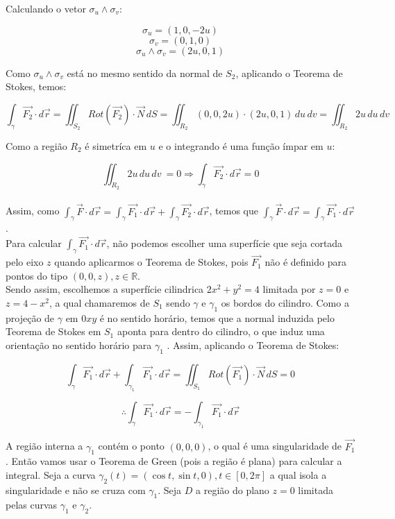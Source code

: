 \documentclass[12pt,a4paper]{article}
\begin{document}
Calculando o vetor $\sigma_{u} \wedge \sigma_{v}$:

\[ \sigma_u = (1,0, -2u ) \]
\[ \sigma_v = (0,1, 0 ) \]
\[  \sigma_u \wedge \sigma_v = ( 2u, 0, 1 ) \] 

Como $\sigma_u \wedge \sigma_v$ está no mesmo sentido da normal de $S_2$, aplicando o Teorema de Stokes, temos:

\[ \int_{\gamma} \vec{F_2} \cdot d\vec{r} = \iint_{S_2} Rot(\vec{F_2}) \cdot \vec{N} \,dS = \iint_{R_2} (0, 0, 2u) \cdot ( 2u, 0, 1 )  \,du \,dv =  \iint_{R_2} 2u \,du \,dv\]

Como a região $R_2$ é simetríca em $u$ e o integrando é uma função ímpar em $u$:

\[ \iint_{R_2} 2u \,du \,dv\ = 0 \Rightarrow  \int_{\gamma} \vec{F_2} \cdot d\vec{r} = 0 \] \\

Assim, como $ \displaystyle  \int_{\gamma} \vec{F} \cdot d\vec{r} =  \int_{\gamma} \vec{F_1} \cdot d\vec{r} +  \int_{\gamma} \vec{F_2} \cdot d\vec{r} $, temos que $ \displaystyle \int_{\gamma} \vec{F} \cdot d\vec{r} =  \int_{\gamma} \vec{F_1} \cdot d\vec{r} $. \\

Para calcular $ \displaystyle \int_{\gamma} \vec{F_1} \cdot d\vec{r} $, não podemos escolher uma superfície que seja cortada pelo eixo $z$ quando aplicarmos o Teorema de Stokes, pois $\vec{F_1}$ não é definido para pontos do tipo $(0,0,z), z \in \mathbb{R} $. \\

Sendo assim, escolhemos a superfície cilindrica $2x^2 + y^2 = 4$ limitada por $z = 0 $ e $z = 4 - x^2 $, a qual chamaremos de $S_1$ sendo $\gamma$ e $\gamma_1$ os bordos do cilindro. Como a projeção de $\gamma $ em $0xy$ é no sentido horário, temos que a normal induzida pelo Teorema de Stokes em $S_1$ aponta para dentro do cilindro, o que induz uma orientação no sentido horário para $ \gamma_1$ . Assim, aplicando o Teorema de Stokes:

\[  \int_{\gamma} \vec{F_1} \cdot d\vec{r} + \int_{\gamma_1} \vec{F_1} \cdot d\vec{r} = \iint_{S_1} Rot(\vec{F_1}) \cdot \vec{N} \,dS = 0 \]


\[ \therefore \int_{\gamma} \vec{F_1} \cdot d\vec{r} = - \int_{\gamma_1} \vec{F_1} \cdot d\vec{r} \]

A região interna a $\gamma_1$ contém o ponto $(0,0,0)$, o qual é uma singularidade de $\vec{F_1}$. Então vamos usar o Teorema de Green (pois a região é plana) para calcular a integral.
Seja a curva $\gamma_2 (t) = ( \cos t, \sin t, 0), t \in [0, 2 \pi] $ a qual isola a singularidade e não se cruza com  $\gamma_1$.
Seja $D$ a região do plano $z=0$ limitada pelas curvas $\gamma_1$ e $\gamma_2$.
\end{document}
